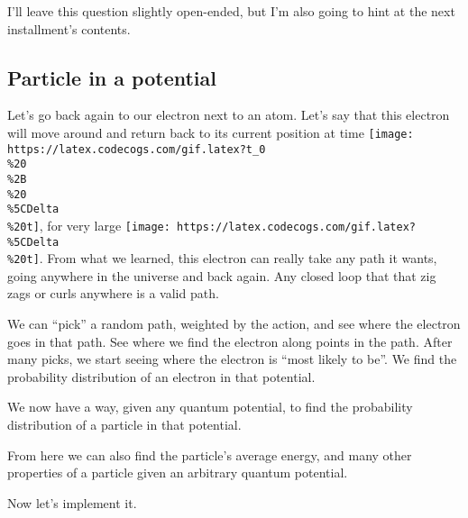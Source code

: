 \documentclass[]{article}
\begin{document}
I'll leave this question slightly open-ended, but I'm also going to hint at the
next installment's contents.

\subsection{Particle in a potential}\label{particle-in-a-potential}

Let's go back again to our electron next to an atom. Let's say that this
electron will move around and return back to its current position at time
\texttt{[image: https://latex.codecogs.com/gif.latex?t\_0\\\%20\\\%2B\\\%20\\\%5CDelta\\\%20t]},
for very large
\texttt{[image: https://latex.codecogs.com/gif.latex?\\\%5CDelta\\\%20t]}. From what
we learned, this electron can really take any path it wants, going anywhere in
the universe and back again. Any closed loop that that zig zags or curls
anywhere is a valid path.

We can ``pick'' a random path, weighted by the action, and see where the
electron goes in that path. See where we find the electron along points in the
path. After many picks, we start seeing where the electron is ``most likely to
be''. We find the probability distribution of an electron in that potential.

We now have a way, given any quantum potential, to find the probability
distribution of a particle in that potential.

From here we can also find the particle's average energy, and many other
properties of a particle given an arbitrary quantum potential.

Now let's implement it.
\end{document}
